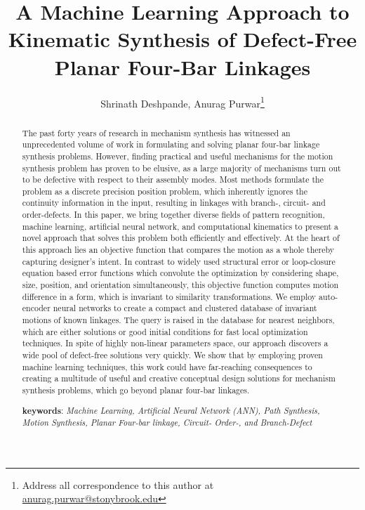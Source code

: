 \documentclass[twocolumn,10pt]{asme2ej}
\title{A Machine Learning Approach to Kinematic Synthesis of Defect-Free Planar Four-Bar Linkages}
\author{Shrinath Deshpande,
	{\tensfb Anurag Purwar\thanks{Address all correspondence to this author at \href{anurag.purwar@stonybrook.edu}{anurag.purwar@stonybrook.edu}}}
    \affiliation{
	Computer-Aided Design and Innovation Lab\\
	Department of Mechanical Engineering\\
	Stony Brook University\\
	Stony Brook, New York, 11794-2300
    }
}
\begin{document}
\maketitle

\begin{abstract}
The past forty years of research in mechanism synthesis has witnessed an unprecedented volume of work in formulating and solving planar four-bar linkage synthesis problems.
However, finding practical and useful mechanisms for the motion synthesis problem has proven to be elusive, as a large majority of mechanisms turn out to be defective with respect to their assembly modes.
Most methods formulate the problem as a discrete precision position problem, which inherently ignores the continuity information in the input, resulting in linkages with branch-, circuit- and order-defects.
In this paper, we bring together diverse fields of pattern recognition, machine learning, artificial neural network, and computational kinematics to present a novel approach that solves this problem both efficiently and effectively.
At the heart of this approach lies an objective function that compares the motion as a whole thereby capturing designer's intent.
In contrast to widely used structural error or loop-closure equation based error functions which convolute the optimization by considering shape, size, position, and orientation simultaneously, this objective function computes motion difference in a form, which is invariant to similarity transformations.
We employ auto-encoder neural networks to create a compact and clustered database of invariant motions of known linkages.
The query is raised in the database for nearest neighbors, which are either solutions or good initial conditions for fast local optimization techniques.
In spite of highly non-linear parameters space, our approach discovers a wide pool of defect-free solutions very quickly.
We show that by employing proven machine learning techniques, this work could have far-reaching consequences to creating a multitude of useful and creative conceptual design solutions for mechanism synthesis problems, which go beyond planar four-bar linkages.

\textbf{keywords}: \emph{Machine Learning, Artificial Neural Network (ANN), Path Synthesis, Motion Synthesis, Planar Four-bar linkage, Circuit- Order-, and Branch-Defect}

\end{abstract}
\end{document}
